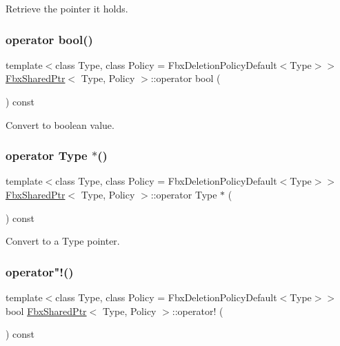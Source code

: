 Retrieve the pointer it holds. 

\mbox{\label{class_fbx_shared_ptr_a5e33203c68a6b6afe36eab50c491ff95}} 
\subsubsection{\texorpdfstring{operator bool()}{operator bool()}}
{\footnotesize\ttfamily template$<$class Type, class Policy = Fbx\+Deletion\+Policy\+Default$<$\+Type$>$$>$ \\
\hyperlink{class_fbx_shared_ptr}{Fbx\+Shared\+Ptr}$<$ Type, Policy $>$\+::operator bool (\begin{DoxyParamCaption}{ }\end{DoxyParamCaption}) const}



Convert to boolean value. 

\mbox{\label{class_fbx_shared_ptr_a4204201633921f32c564bd9329fe78fb}} 
\subsubsection{\texorpdfstring{operator Type $\ast$()}{operator Type *()}}
{\footnotesize\ttfamily template$<$class Type, class Policy = Fbx\+Deletion\+Policy\+Default$<$\+Type$>$$>$ \\
\hyperlink{class_fbx_shared_ptr}{Fbx\+Shared\+Ptr}$<$ Type, Policy $>$\+::operator Type $\ast$ (\begin{DoxyParamCaption}{ }\end{DoxyParamCaption}) const}



Convert to a Type pointer. 

\mbox{\label{class_fbx_shared_ptr_ac52a41b234d83cb8fa5deb75e740d950}} 
\subsubsection{\texorpdfstring{operator"!()}{operator!()}}
{\footnotesize\ttfamily template$<$class Type, class Policy = Fbx\+Deletion\+Policy\+Default$<$\+Type$>$$>$ \\
bool \hyperlink{class_fbx_shared_ptr}{Fbx\+Shared\+Ptr}$<$ Type, Policy $>$\+::operator! (\begin{DoxyParamCaption}{ }\end{DoxyParamCaption}) const}



